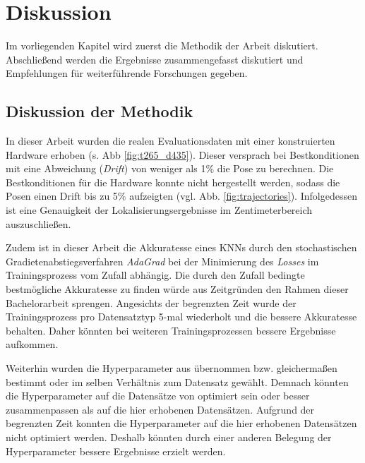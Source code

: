 
\section{Diskussion}
\label{sec:kapitel_5}
Im vorliegenden Kapitel wird zuerst die Methodik der Arbeit diskutiert. Abschließend werden die Ergebnisse zusammengefasst diskutiert und Empfehlungen für weiterführende Forschungen gegeben. 


\subsection{Diskussion der Methodik}
\label{subsec:disc_methode}

In dieser Arbeit wurden die realen Evaluationsdaten mit einer konstruierten Hardware erhoben (s. Abb \ref{fig:t265_d435}). Dieser versprach bei Bestkonditionen mit eine Abweichung (\textit{Drift}) von weniger als 1\% die Pose zu berechnen. Die Bestkonditionen für die Hardware konnte nicht hergestellt werden, sodass die Posen einen Drift bis zu 5\% aufzeigten (vgl. Abb. \ref{fig:trajectories}). Infolgedessen ist eine Genauigkeit der Lokalisierungsergebnisse im Zentimeterbereich auszuschließen.


Zudem ist in dieser Arbeit die Akkuratesse eines KNNs durch den stochastischen Gradietenabstiegsverfahren \textit{AdaGrad} bei der Minimierung des \textit{Losses} im Trainingsprozess vom Zufall abhängig. Die durch den Zufall bedingte bestmögliche Akkuratesse zu finden würde aus Zeitgründen den Rahmen dieser Bachelorarbeit sprengen. Angesichts der begrenzten Zeit wurde der Trainingsprozess pro Datensatztyp 5-mal wiederholt und die bessere Akkuratesse behalten. Daher könnten bei weiteren Trainingsprozessen bessere Ergebnisse aufkommen.

Weiterhin wurden die Hyperparameter aus \citet{acharyaBIMPoseNetIndoorCamera2019} übernommen bzw. gleichermaßen bestimmt oder im selben Verhältnis zum Datensatz gewählt. Demnach könnten die Hyperparameter auf die Datensätze von \citet{acharyaBIMPoseNetIndoorCamera2019} optimiert sein oder besser zusammenpassen als auf die hier erhobenen Datensätzen. Aufgrund der begrenzten Zeit konnten die Hyperparameter auf die hier erhobenen Datensätzen nicht optimiert werden. Deshalb könnten durch einer anderen Belegung der Hyperparameter bessere Ergebnisse erzielt werden.

